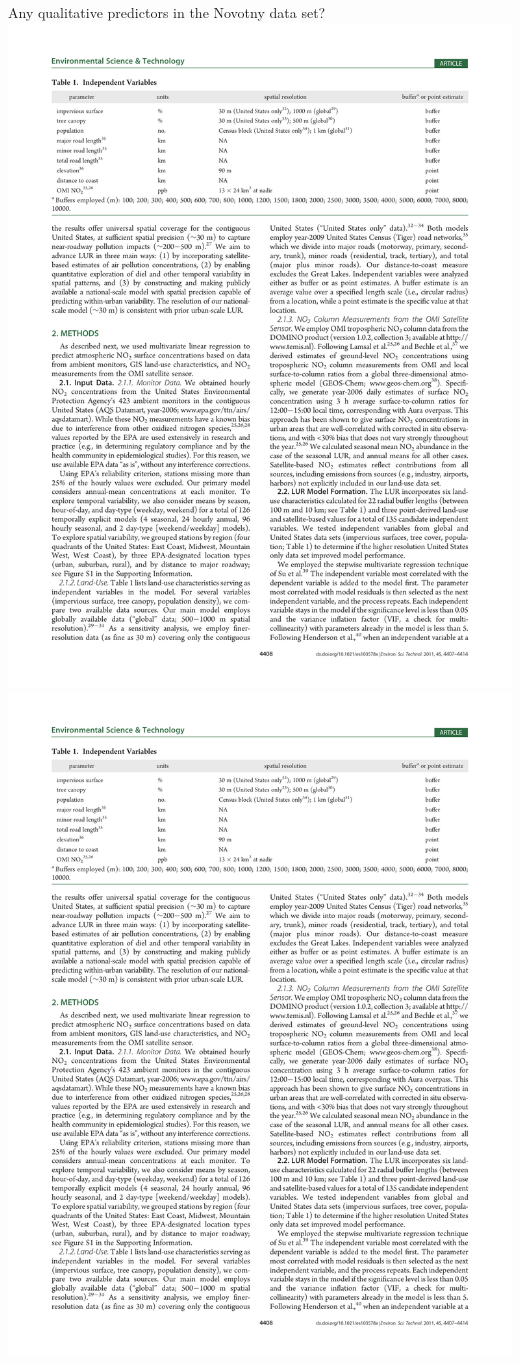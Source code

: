 \documentclass[aspectratio=169]{beamer}
\begin{document}
\begin{frame}{Any qualitative predictors in the Novotny data set?}
\includegraphics[height=0.5\textheight]{novotny_tab1_1}
\includegraphics[height=0.5\textheight]{novotny_tab1_2}

\end{frame}
\end{document}
